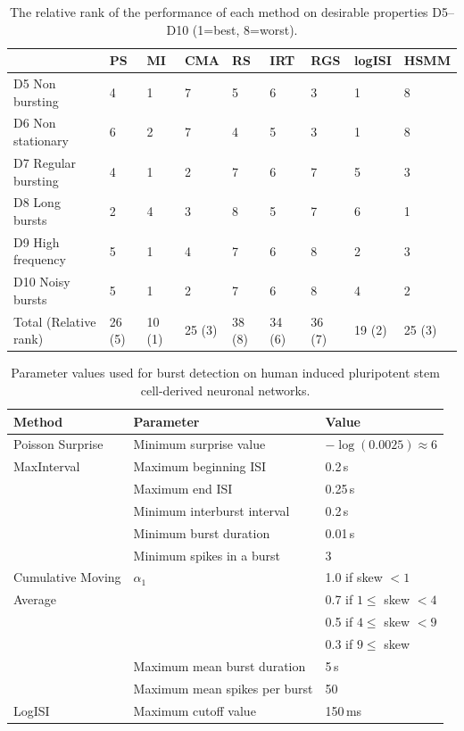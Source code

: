 \documentclass[12pt, titlepage]{article}
\begin{document}
				\begin{table}
					\centering \begin{tabular}{|l|llllllll|}
						\hline
						& PS & MI & CMA & RS & IRT & RGS & logISI & HSMM
						\\ \hline \rowcolor{Gray} D5 Non bursting & 4 & 1 & 7 & 5 & 6 & 3 & 1 &  8
						\\D6 Non stationary & 6 & 2 & 7 & 4 & 5 & 3 & 1 & 8 
						\\ \rowcolor{Gray}D7 Regular bursting & 4 & 1 & 2 & 7 & 6 & 7 & 5 & 3
						\\ D8 Long bursts & 2 & 4 & 3 & 8 & 5 & 7 & 6 & 1
						\\ \rowcolor{Gray} D9 High frequency & 5 & 1 & 4 & 7 & 6 & 8 & 2 & 3
						\\ D10 Noisy bursts & 5 & 1 & 2 & 7 & 6 & 8 & 4 & 2
						\\ \hline  \rowcolor{Gray} Total (Relative rank) & 26 (5) & 10 (1) & 25 (3) & 38 (8) & 34 (6) & 36 (7) & 19 (2) & 25 (3)
						\\ \hline
					\end{tabular}
					\caption{The relative rank of the performance of each method on desirable properties D5--D10 (1=best, 8=worst).} \label{des_results2}
				\end{table}	
				\begin{table}[h]
					\centering
					\begin{tabular}{|l|l|l|}
						\hline
						Method & Parameter & Value
						\\ \hline 	
						\rowcolor{Gray} Poisson Surprise  & Minimum surprise value & $-\log(0.0025) \approx 6$\\ \hline 
						MaxInterval & Maximum beginning ISI & 0.2$\,$s
						\\ & Maximum end ISI & 0.25$\,$s
						\\ & Minimum interburst interval & 0.2$\,$s
						\\ & Minimum burst duration & 0.01$\,$s
						\\ & Minimum spikes in a burst & 3
						\\ \hline
						\rowcolor{Gray} Cumulative Moving & $\alpha_1$ & 1.0 if skew $<1$
						\\ \rowcolor{Gray} Average & &  0.7  if $1 \leq $ skew $<4$
						\\ \rowcolor{Gray} & & 0.5  if $4 \leq $ skew $<9$
						\\ \rowcolor{Gray} & & 0.3  if  $9 \leq$ skew 
						\\ \rowcolor{Gray} & Maximum mean burst duration & 5$\,$s
						\\ \rowcolor{Gray} & Maximum mean spikes per burst & 50
						\\ \hline 
						LogISI & Maximum cutoff value & 150$\,$ms
						\\ \hline
						
					\end{tabular}
					\caption{Parameter values used for burst detection on human induced pluripotent stem cell-derived neuronal networks.}
					\label{param_vals_hum}
				\end{table}	
		\clearpage
		 
		
	
\end{document}
